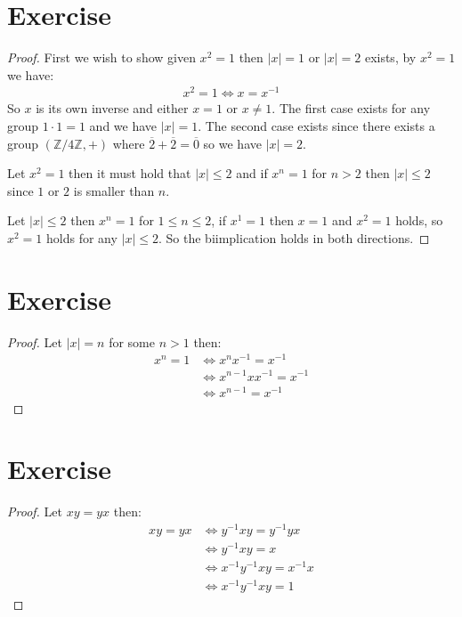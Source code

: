 \documentclass{article}
\begin{document}
\section{Exercise}
\begin{proof}
    First we wish to show given $x^2 = 1$ then $|x| = 1$ or $|x| = 2$ exists, by
    $x^2 = 1$ we have: 
    \begin{gather*}
        x^2 = 1 \iff x = x^{-1} 
    \end{gather*}
    So $x$ is its own inverse and either $x = 1$ or $x \neq 1$. The first case
    exists for any group $1 \cdot 1 = 1$ and we have $|x| = 1$. The second case
    exists since there exists a group $(\mathbb{Z}/4\mathbb{Z}, +)$ where
    $\overline{2} + \overline{2} = \overline{0}$ so we have $|x| = 2$.
    
    Let $x^2 = 1$ then it must hold that $|x| \leq 2$ and if $x^n = 1$ for $n
    > 2$ then $|x| \leq 2$ since $1$ or $2$ is smaller than $n$.
    
    Let $|x| \leq 2$ then $x^n = 1$ for $1 \leq n \leq 2$, if $x^1 = 1$ then $x
    = 1$ and $x^2 = 1$ holds, so $x^2 = 1$ holds for any $|x| \leq 2$. So the
    biimplication holds in both directions.
\end{proof}
\section{Exercise}
\begin{proof}
    Let $|x| = n$ for some $n > 1$ then:
    \begin{align*}
        x^n = 1 &\iff x^nx^{-1} = x^{-1} \\
        & \iff x^{n - 1}xx^{-1} = x^{-1} \\
        &\iff x^{n - 1} = x^{-1}
    \end{align*}
\end{proof}
\section{Exercise}
\begin{proof}
    Let $xy = yx$ then:
    \begin{align*}
        xy = yx &\iff y^{-1} xy = y^{-1}y x \\
        &\iff y^{-1} xy = x \\
        &\iff x^{-1}y^{-1} xy = x^{-1}x \\
        &\iff x^{-1}y^{-1} xy = 1
    \end{align*}
\end{proof}
\end{document}
